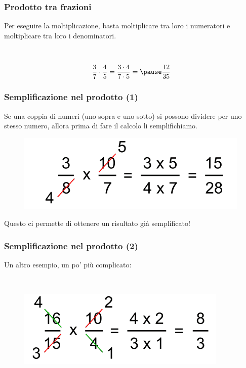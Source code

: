 \documentclass[]{beamer}
\theoremstyle{plain}
\begin{document}
\begin{frame}
\frametitle{Prodotto tra frazioni}
Per eseguire la moltiplicazione, basta \alert{moltiplicare tra loro i numeratori} e \alert{moltiplicare tra loro i denominatori}.

~

\[ \frac{3}{7} \cdot \frac{4}{5} = \frac{3 \cdot 4}{7 \cdot 5} = \pause\frac{12}{35} \]
\end{frame}


\begin{frame}
\frametitle{Semplificazione nel prodotto (1)}
Se una coppia di numeri (uno sopra e uno sotto) \alert{si possono dividere per uno stesso numero}, allora prima di fare il calcolo li \alert{semplifichiamo}.\pause

\begin{figure}
  \includegraphics[width=.55\columnwidth]{img/semplif2.png}
\end{figure}

Questo ci permette di ottenere un risultato \alert{già semplificato}!
\end{frame}



\begin{frame}
\frametitle{Semplificazione nel prodotto (2)}
Un altro esempio, un po' più complicato:

~

\begin{figure}
  \includegraphics[width=.55\columnwidth]{img/semplif3.png}
\end{figure}
\end{frame}
\end{document}
